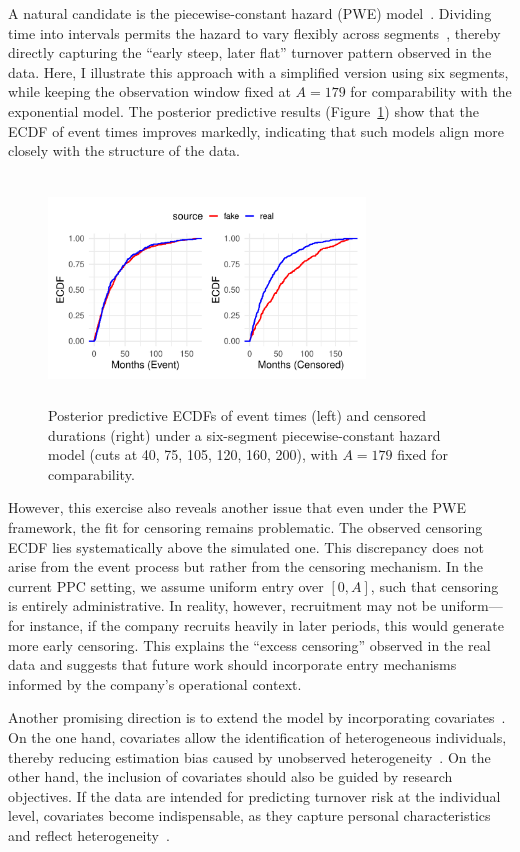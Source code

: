 A natural candidate is the piecewise-constant hazard (PWE) model~\cite{ibrahim2013bayesian}. Dividing time into intervals permits the hazard to vary flexibly across segments~\cite{gelman1995bayesian}, thereby directly capturing the “early steep, later flat” turnover pattern observed in the data. Here, I illustrate this approach with a simplified version using six segments, while keeping the observation window fixed at $A=179$ for comparability with the exponential model. The posterior predictive results (Figure~\ref{fig:piecew6}) show that the ECDF of event times improves markedly, indicating that such models align more closely with the structure of the data.
\begin{figure}[H]
    \centering
    \includegraphics[height=6cm, width=0.75\textwidth]{images/piece6_ecdf_comparison.pdf}
    \caption{{\small Posterior predictive ECDFs of event times (left) and censored durations (right) under a six-segment piecewise-constant hazard model (cuts at 40, 75, 105, 120, 160, 200), with $A=179$ fixed for comparability.}}
    \label{fig:piecew6}
\end{figure}
However, this exercise also reveals another issue that even under the PWE framework, the fit for censoring remains problematic. The observed censoring ECDF lies systematically above the simulated one. This discrepancy does not arise from the event process but rather from the censoring mechanism. In the current PPC setting, we assume uniform entry over $[0, A]$, such that censoring is entirely administrative. In reality, however, recruitment may not be uniform—for instance, if the company recruits heavily in later periods, this would generate more early censoring. This explains the “excess censoring” observed in the real data and suggests that future work should incorporate entry mechanisms informed by the company’s operational context.

Another promising direction is to extend the model by incorporating covariates~\cite{ibrahim2013bayesian}. On the one hand, covariates allow the identification of heterogeneous individuals, thereby reducing estimation bias caused by unobserved heterogeneity~\cite{mahama5342937modeling}. On the other hand, the inclusion of covariates should also be guided by research objectives. If the data are intended for predicting turnover risk at the individual level, covariates become indispensable, as they capture personal characteristics and reflect heterogeneity~\cite{gelman1995bayesian,ibrahim2013bayesian, bartovs2022informed}.

